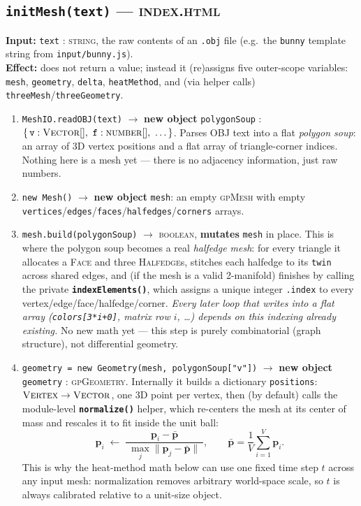 \documentclass[11pt]{article}
\newcommand{\code}[1]{\texttt{#1}}
\newcommand{\func}[1]{\texttt{\textbf{#1}}}
\newcommand{\type}[1]{\textsc{#1}}
\begin{document}
\subsection*{\func{initMesh(text)} --- \type{index.html}}
\textbf{Input:} \code{text} : \type{string}, the raw contents of an \code{.obj} file (e.g.\
the \code{bunny} template string from \code{input/bunny.js}).\\
\textbf{Effect:} does not return a value; instead it (re)assigns five outer-scope variables:
\code{mesh}, \code{geometry}, \code{delta}, \code{heatMethod}, and (via helper calls)
\code{threeMesh}/\code{threeGeometry}.

\begin{enumerate}[leftmargin=1.6em]

\item \code{MeshIO.readOBJ(text)} $\to$ \textbf{new object} \code{polygonSoup} :
  $\{\,\code{v}: \type{Vector}[],\ \code{f}: \type{number}[],\ \dots\,\}$.
  Parses OBJ text into a flat \emph{polygon soup}: an array of 3D vertex positions and a
  flat array of triangle-corner indices. Nothing here is a mesh yet --- there is no
  adjacency information, just raw numbers.

\item \code{new Mesh()} $\to$ \textbf{new object} \code{mesh}: an empty
  \type{gpMesh} with empty \code{vertices}/\code{edges}/\code{faces}/\code{halfedges}/\code{corners}
  arrays.

\item \code{mesh.build(polygonSoup)} $\to$ \type{boolean}, \textbf{mutates} \code{mesh} in place.
  This is where the polygon soup becomes a real \emph{halfedge mesh}: for every triangle it
  allocates a \type{Face} and three \type{Halfedge}s, stitches each halfedge to its
  \code{twin} across shared edges, and (if the mesh is a valid 2-manifold) finishes by
  calling the private \func{indexElements()}, which assigns a unique integer \code{.index}
  to every vertex/edge/face/halfedge/corner. \emph{Every later loop that writes into a flat
  array (\code{colors[3*i+0]}, matrix row $i$, \ldots) depends on this indexing already
  existing.} No new math yet --- this step is purely combinatorial (graph structure), not
  differential geometry.

\item \code{geometry = new Geometry(mesh, polygonSoup["v"])} $\to$ \textbf{new object}
  \code{geometry} : \type{gpGeometry}. Internally it builds a dictionary
  \code{positions}: $\type{Vertex}\to\type{Vector}$, one 3D point per vertex, then (by
  default) calls the module-level \func{normalize()} helper, which re-centers the mesh at
  its center of mass and rescales it to fit inside the unit ball:
  \[
    \mathbf{p}_i \;\leftarrow\; \frac{\mathbf{p}_i - \bar{\mathbf{p}}}{\;\max_j \lVert \mathbf{p}_j-\bar{\mathbf{p}}\rVert\;},
    \qquad
    \bar{\mathbf{p}} = \frac{1}{V}\sum_{i=1}^{V}\mathbf{p}_i .
  \]
  This is why the heat-method math below can use one fixed time step $t$ across any input
  mesh: normalization removes arbitrary world-space scale, so $t$ is always calibrated
  relative to a unit-size object.


\end{enumerate}
\end{document}
